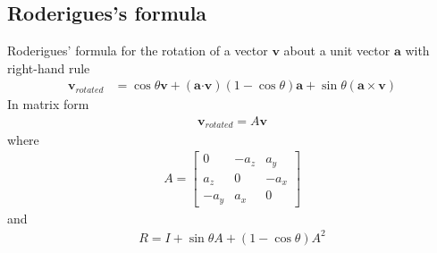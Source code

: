 \documentclass[10pt,letterpaper,notitlepage]{article}
\numberwithin{equation}{section}
\newcommand{\dotp}{\boldsymbol{\cdot}}
\newcommand{\beqn}{\begin{equation}\begin{aligned}}
\newcommand{\eeqn}{\end{aligned}\end{equation}}
\begin{document}
\newpage
\begin{appendices}
\section{Roderigues's formula} \label{appendix:Roderigues_formula}
Roderigues' formula for the rotation of a vector $\mathbf{v}$ about a unit vector $\mathbf{a}$ with right-hand rule
\begin{equation}
\newcommand{\vvec}{\mathbf{v}}
\newcommand{\avec}{\mathbf{a}}
\begin{aligned}
\vvec_{rotated} &= \cos \theta \vvec + (\avec \dotp \vvec)(1-\cos \theta) \avec + \sin \theta (\avec \times \vvec)
\end{aligned}
\end{equation}
In matrix form
\beqn 
\mathbf{v}_{rotated} = A \mathbf{v}
\eeqn 
where
\beqn 
A = 
\begin{bmatrix}
0 & -a_z & a_y \\
a_z & 0 & -a_x \\
-a_y & a_x & 0
\end{bmatrix}
\eeqn 
and
\beqn 
R = I + \sin\theta A + (1-\cos\theta) A^2
\eeqn



\end{appendices}
\end{document}
